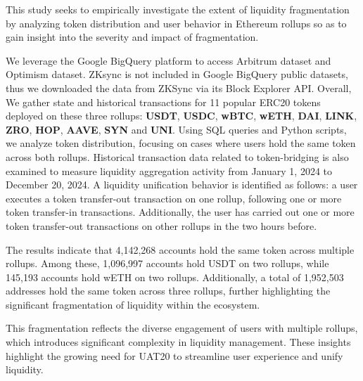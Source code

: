 This study seeks to empirically investigate the extent of liquidity fragmentation by analyzing token distribution and user behavior in Ethereum rollups so as to gain insight into the severity and impact of fragmentation. 


  We leverage the Google BigQuery platform \cite{google_bigquery} to access Arbitrum dataset and Optimism dataset. ZKsync is not included in Google BigQuery public datasets, thus we  downloaded the data from ZKSync via its Block Explorer API\cite{zksyncapi}. Overall, We gather state and historical transactions for 11 popular ERC20 tokens deployed on these three rollups: \textbf{USDT}, \textbf{USDC}, \textbf{wBTC}, \textbf{wETH}, \textbf{DAI}, \textbf{LINK}, \textbf{ZRO}, \textbf{HOP}, \textbf{AAVE}, \textbf{SYN} and \textbf{UNI}. Using SQL queries and Python scripts, we analyze token distribution, focusing on cases where users hold the same token across both rollups. Historical transaction data related to token-bridging is also examined to measure liquidity aggregation activity from January 1, 2024 to December 20, 2024.
A liquidity unification behavior is identified as follows:
a user executes a token transfer-out transaction on one rollup, following one or more token transfer-in transactions. Additionally, the user has carried out one or more token transfer-out transactions on other rollups in the two hours before.


 The results indicate that 4,142,268 accounts hold the same token across multiple rollups. Among these, 1,096,997 accounts hold USDT on two rollups, while 145,193 accounts hold wETH on two rollups. Additionally, a total of 1,952,503 addresses hold the same token across three rollups, further highlighting the significant fragmentation of liquidity within the ecosystem.

This fragmentation reflects the diverse engagement of users with multiple rollups, which introduces significant complexity in liquidity management. These insights highlight the growing need for UAT20 to streamline user experience and unify liquidity.

